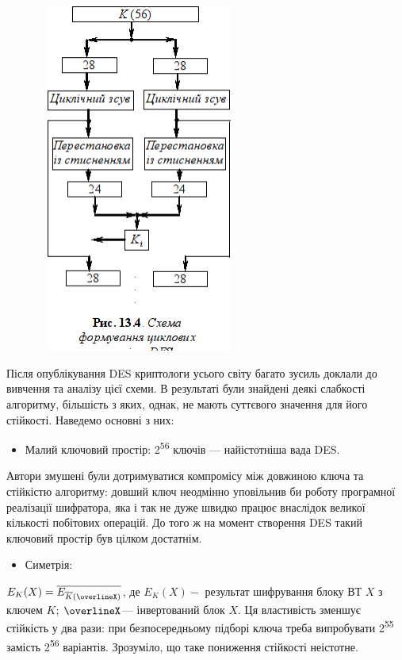 \begin{figure}
\centering
\includegraphics[width=2.6492in,height=4.5236in]{crypt-img/crypt-img297.png}
\end{figure}
Після опублікування DES  криптологи усього світу багато зусиль доклали  до
вивчення та аналізу цієї схеми. В результаті були знайдені деякі слабкості
алгоритму, більшість з яких, однак, не мають суттєвого значення для його
стійкості. Наведемо основні з них:

\liststyleWWviiiNumxlix
\begin{itemize}
\item Малий ключовий простір: 2\textsuperscript{56} ключів --- найістотніша вада
DES. 
\end{itemize}
Автори змушені були дотримуватися компромісу між довжиною ключа та стійкістю
алгоритму: довший ключ неодмінно уповільнив би роботу програмної реалізації
шифратора, яка і так не дуже швидко працює внаслідок великої кількості
побітових операцій. До того ж на момент створення DES такий ключовий простір
був цілком достатнім.

\liststyleWWviiiNumxlix
\begin{itemize}
\item Симетрія:
\end{itemize}
 $E_{K}(X)=\overline{E_{{\overline{{K}}}(\overlineX)}}$, де 
$E_K(X)-$ результат шифрування блоку ВТ  $X$ з ключем  $K$; 
$\overlineX$--- інвертований блок  $X$. Ця властивість зменшує стійкість
у два рази: при безпосередньому підборі ключа треба випробувати
2\textsuperscript{55} замість 2\textsuperscript{56} варіантів. Зрозуміло, що
таке пониження стійкості неістотне.

